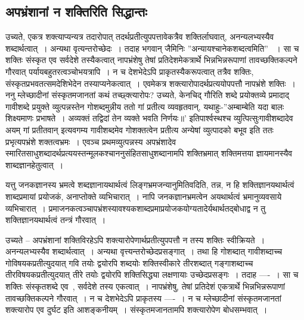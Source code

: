 		\subsection{अपभ्रंशानां न शक्तिरिति सिद्धान्तः}

			\begin{small}

				उच्यते, एकत्र शक्त्याप्यन्यत्र तदारोपात् तदर्थप्रतीत्युपपत्तावेकत्रैव शक्तिर्लाघवात्, अनन्यलभ्यस्यैव शब्दार्थत्वात्~। अन्यथा वृत्यन्तरोच्छेदः~। तदाह भगवान् जैमिनिः  ”अन्यायश्चानेकशब्दत्वमिति” ~। सा च शक्तिः संस्कृत एव सर्वदेशे तस्यैकत्वात् नापभ्रंशेषु तेषां प्रतिदेशमेकत्रार्थे भिन्नभिन्नरूपाणां तावच्छक्तिकल्पने गौरवात् पर्यायबहुतरत्वञ्चोभयत्रापि~। न च देशभेदेऽपि प्राकृतस्यैकरूपत्वात् तत्रैव शक्तिः, संस्कृतप्रभवतत्समदेशिभेदेन तस्याप्यनेकत्वात्~। एवमेकत्र शक्त्यारोपादर्थप्रत्ययोपपत्तौ नापभ्रंशे शक्तिः~। ननु म्लेच्छादीनां संस्कृतमजानतां कथं तच्छ्क्त्यारोपः? उच्यते, केनचिद् गौरिति  शब्दे प्रयोक्तव्ये प्रमादाद् गावीशब्दे प्रयुक्ते व्युत्पन्नस्तेन गोशब्दमुन्नीय ततो गां प्रतीत्य व्यवहृतवान्, यथाहुः-”अम्बाम्बेति यदा बालः शिक्ष्यमाणः प्रभाषते~। अव्यक्तं तद्विदां तेन व्यक्ते भवति निर्णयः॥’ इतिपार्श्वस्थश्च व्युत्पित्सुःगावीशब्दादेव अयम् गां प्रतीतवान् इत्यवगम्य गावीशब्दमेव  गोशक्तत्वेन प्रतीत्य  अन्येषां व्युत्पादको  बभूव इति ततः प्रभृत्यपभ्रंशे शक्तत्वभ्रमः~। एवञ्च प्रथमव्युत्पन्नस्य अपभ्रंशादेव  स्मारितसाधुशब्दादर्थप्रत्ययस्तन्मूलकश्चाननुसंहितसाधुशब्दानामपि शक्तिभ्रमात् शक्तिमत्तया ज्ञायमानस्यैव शाब्दज्ञानहेतुत्वात्~। 
				
				यत्तु जनकज्ञानस्य  भ्रमत्वे  शब्दज्ञानायथार्थत्वं लिङ्गभ्रमजन्यानुमितिवदिति,  तन्न, न हि शक्तिज्ञानयथार्थत्वं   शाब्दप्रमायां प्रयोजकं, अनाप्तोक्ते  व्यभिचारात्~। नापि जनकज्ञानभ्रमत्वेन अयथार्थत्वं  भ्रमानुव्यवसाये  व्यभिचारात्~। प्रमाजनकत्वञ्चापभ्रंशस्यावश्यकशाब्दप्रमाप्रयोजकयोग्यतादेर्यथार्थतद्बोधाद्व  न तु शक्तिज्ञानयथार्थत्वं तन्त्रं  गौरवात्~। 
			\end{small}

			उच्यते – अपभ्रंशानां शक्तिविरहेऽपि शक्त्यारोपेणार्थप्रतीत्युपपत्तौ न तस्य शक्तिः स्वीक्रियते~। अनन्यलभ्यस्यैव शब्दार्थत्वात्~। अन्यथा वृत्त्यन्तरोच्छेदप्रसङ्गात्~। तथा हि गोशब्दात् गावीशब्दाच्च गोविषयकप्रतीत्युदयात् गवि तयोः द्वयोरपि शब्दयोः शक्तिस्वीकारे तीरशब्दात् गङ्गाशब्दाच्च तीरविषयकप्रतीत्युदयात् तीरे तयोः द्वयोरपि शक्तिसिद्ध्या लक्षणायाः उच्छेदप्रसङ्गः~। तदाह ----~। सा च शक्तिः संस्कृतशब्दे एव~, सर्वदेशे तस्य एकत्वात्~। नापभ्रंशेषु, तेषां प्रतिदेशं एकत्रार्थे भिन्नभिन्नरूपाणां तावच्छक्तिकल्पने गौरवात्~। न च देशभेदेऽपि प्राकृतस्य ----~। न च म्लेच्छादीनां संस्कृतमजानतां शक्त्यारोप एव दुर्घट इति आशङ्कनीयम्~। संस्कृतमजानतामपि शक्त्यारोपेण बोधसम्भवात्~।  

